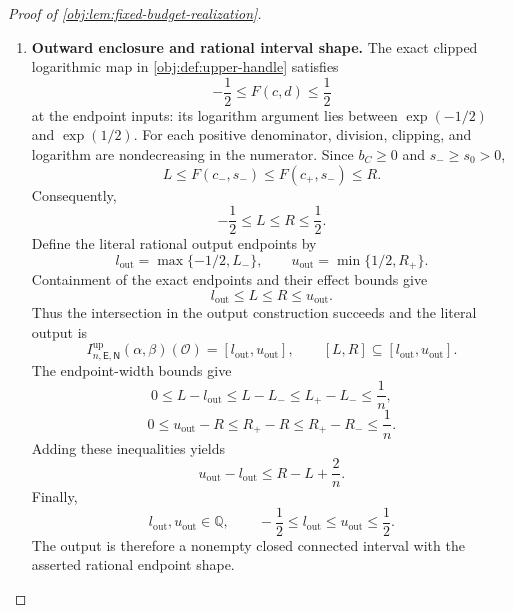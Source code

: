 \documentclass[11pt]{article}
\begin{document}
\begin{proof}[Proof of \cref{obj:lem:fixed-budget-realization}]
\begin{enumerate}
\item \textbf{Outward enclosure and rational interval shape.}
The exact clipped logarithmic map in \cref{obj:def:upper-handle} satisfies
\[
-\frac12\le F(c,d)\le\frac12
\]
at the endpoint inputs: its logarithm argument lies between
\(\exp(-1/2)\) and \(\exp(1/2)\). For each positive denominator, division, clipping, and logarithm are nondecreasing in the numerator. Since \(b_C\ge0\) and \(s_-\ge s_0>0\),
\[
L
\le F(c_-,s_-)
\le F(c_+,s_-)
\le R.
\]
Consequently,
\[
-\frac12\le L\le R\le\frac12.
\]
Define the literal rational output endpoints by
\[
l_{\mathrm{out}}=\max\{-1/2,L_-\},
\qquad
u_{\mathrm{out}}=\min\{1/2,R_+\}.
\]
Containment of the exact endpoints and their effect bounds give
\[
l_{\mathrm{out}}\le L\le R\le u_{\mathrm{out}}.
\]
Thus the intersection in the output construction succeeds and the literal output is
\[
I^{\mathrm{up}}_{n,\mathsf E,\mathsf N}(\alpha,\beta)(\mathcal O)
=[l_{\mathrm{out}},u_{\mathrm{out}}],
\qquad
[L,R]\subseteq[l_{\mathrm{out}},u_{\mathrm{out}}].
\]
The endpoint-width bounds give
\[
0\le L-l_{\mathrm{out}}
\le L-L_-\le L_+-L_-\le\frac1n,
\]
\[
0\le u_{\mathrm{out}}-R
\le R_+-R\le R_+-R_-\le\frac1n.
\]
Adding these inequalities yields
\[
u_{\mathrm{out}}-l_{\mathrm{out}}
\le R-L+\frac2n.
\]
Finally,
\[
l_{\mathrm{out}},u_{\mathrm{out}}\in\mathbb Q,
\qquad
-\frac12\le l_{\mathrm{out}}\le u_{\mathrm{out}}\le\frac12.
\]
The output is therefore a nonempty closed connected interval with the asserted rational endpoint shape.


\end{enumerate}
\end{proof}
\end{document}
